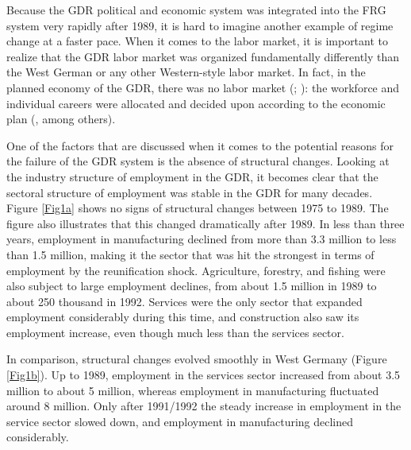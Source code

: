 \begin{Article}
\begin{refsection}[Spitz]
Because the GDR political and economic system was integrated into the FRG system very rapidly after 1989, it is hard to imagine another example of regime change at a faster pace. When it comes to the labor market, it is important to realize that the GDR labor market was organized fundamentally differently than the West German or any other Western-style labor market. In fact, in the planned economy of the GDR, there was no labor market (\textcite{Hoene1991}; \textcite{LutzNickelSchmidtSorge1996}): the workforce and individual careers were allocated and decided upon according to the economic plan (\textcite{Gruenert1996}, among others). 

One of the factors that are discussed when it comes to the potential reasons for the failure of the GDR system is the absence of structural changes. Looking at the industry structure of employment in the GDR, it becomes clear that the sectoral structure of employment was stable in the GDR for many decades. Figure \ref{Fig1a} shows no signs of structural changes between 1975 to 1989. The figure also illustrates that this changed dramatically after 1989. In less than three years, employment in manufacturing declined from more than 3.3 million to less than 1.5 million, making it the sector that was hit the strongest in terms of employment by the reunification shock. Agriculture, forestry, and fishing were also subject to large employment declines, from about 1.5 million in 1989 to about 250 thousand in 1992. Services were the only sector that expanded employment considerably during this time, and construction also saw its employment increase, even though much less than the services sector.

In comparison, structural changes evolved smoothly in West Germany (Figure \ref{Fig1b}). Up to 1989, employment in the services sector increased from about 3.5 million to about 5 million, whereas employment in manufacturing fluctuated around 8 million. Only after 1991/1992 the steady increase in employment in the service sector slowed down, and employment in manufacturing declined considerably.


\end{refsection}
\end{Article}
